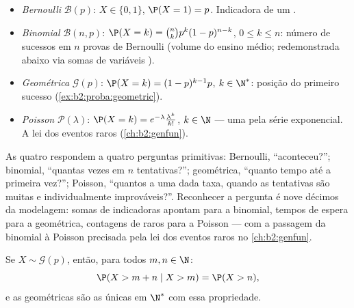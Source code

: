 \begin{example}\label{ex:b2:randomvar:laws}
\leavevmode
\begin{itemize}
\item \emph{Bernoulli} $\mathcal{B}(p)$: $X \in \{0, 1\}$, $\P(X =
1) = p$. Indicadora de um .
\item \emph{Binomial} $\mathcal{B}(n, p)$: $\P(X = k) =
\binom nk p^k(1-p)^{n-k}$, $0 \leq k \leq n$: número de sucessos
em $n$ provas de Bernoulli  (volume do ensino médio; redemonstrada
abaixo via somas de variáveis ).
\item \emph{Geométrica} $\mathcal{G}(p)$: $\P(X = k) =
(1-p)^{k-1}p$, $k \in \N^*$: posição do primeiro sucesso
(\cref{ex:b2:proba:geometric}).
\item \emph{Poisson} $\mathcal{P}(\lambda)$: $\P(X = k) =
e^{-\lambda}\frac{\lambda^k}{k!}$, $k \in \N$ --- uma  pela série exponencial. A lei dos eventos raros
(\cref{ch:b2:genfun}).
\end{itemize}
\end{example}

\begin{remark}
As quatro  respondem a quatro perguntas primitivas: Bernoulli,
``aconteceu?''; binomial, ``quantas vezes em $n$
tentativas?''; geométrica, ``quanto tempo até a primeira vez?'';
Poisson, ``quantos  a uma dada taxa, quando as tentativas são
muitas e individualmente improváveis?''. Reconhecer a pergunta
é nove décimos da modelagem: somas de indicadoras apontam para
a binomial, tempos de espera para a geométrica, contagens de
 raros para a Poisson --- com a passagem da binomial à
Poisson precisada pela lei dos eventos raros no
\cref{ch:b2:genfun}.
\end{remark}

\begin{proposition}\label{prop:b2:randomvar:memoryless}
Se $X \sim \mathcal{G}(p)$, então, para todos $m, n \in \N$:
\[
\P(X > m + n \mid X > m) = \P(X > n) ,
\]
e as  geométricas são as únicas  em $\N^*$ com essa
propriedade.
\end{proposition}


